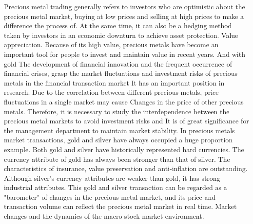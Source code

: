 \begin{eabstract}

Precious metal trading generally refers to investors who are optimistic about
the precious metal market, buying at low prices and selling at high prices to
make a difference the process of. At the same time, it can also be a hedging
method taken by investors in an economic downturn to achieve asset protection.
Value appreciation. Because of its high value, precious metals have become an
important tool for people to invest and maintain value in recent years. And with
gold The development of financial innovation and the frequent occurrence of
financial crises, grasp the market fluctuations and investment risks of precious
metals in the financial transaction market It has an important position in
research. Due to the correlation between different precious metals, price
fluctuations in a single market may cause Changes in the price of other precious
metals. Therefore, it is necessary to study the interdependence between the
precious metal markets to avoid investment risks and It is of great significance
for the management department to maintain market stability. In precious metals
market transactions, gold and silver have always occupied a huge proportion
example. Both gold and silver have historically represented hard currencies. The
currency attribute of gold has always been stronger than that of silver. The
characteristics of insurance, value preservation and anti-inflation are
outstanding. Although silver’s currency attributes are weaker than gold, it has
strong industrial attributes. This gold and silver transaction can be regarded
as a "barometer" of changes in the precious metal market, and its price and
transaction volume can reflect the precious metal market in real time. Market
changes and the dynamics of the macro stock market environment.


\end{eabstract}
